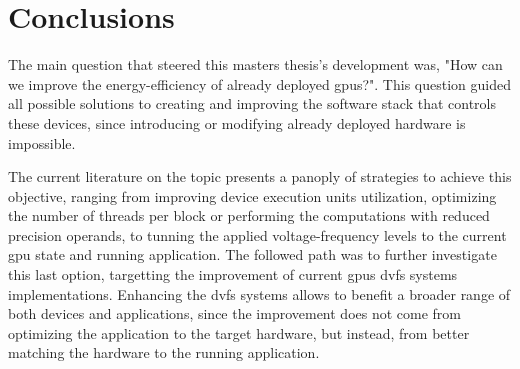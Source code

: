 
\chapter{Conclusions}
\label{chapter:conclusions}

The main question that steered this masters thesis's development was, "How can we improve the energy-efficiency of already deployed \acrshort{gpu}s?". This question guided all possible solutions to creating and improving the software stack that controls these devices, since introducing or modifying already deployed hardware is impossible.

The current literature on the topic presents a panoply of strategies to achieve this objective, ranging from improving device execution units utilization, optimizing the number of threads per block or performing the computations with reduced precision operands, to tunning the applied voltage-frequency levels to the current \acrshort{gpu} state and running application. The followed path was to further investigate this last option, targetting the improvement of current \acrshort{gpu}s \acrshort{dvfs} systems implementations. Enhancing the \acrshort{dvfs} systems allows to benefit a broader range of both devices and applications, since the improvement does not come from optimizing the application to the target hardware, but instead, from better matching the hardware to the running application.

